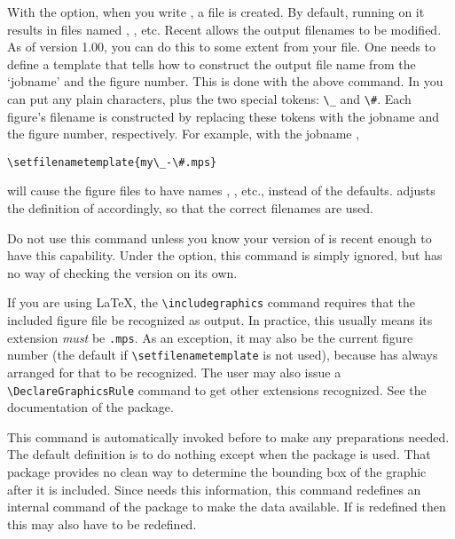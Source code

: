 \documentclass[letterpaper]{article}
\begin{document}
With the  option, when you write
, a file  is created. By
default, running \MP{} on it results in files named ,
, etc. Recent \MP{} allows the output filenames to be
modified. As of \mfp{} version 1.00, you can do this to some extent from
your  file. One needs to define a template that tells \MP{}
how to construct the output file name from the `jobname' and the figure
number. This is done with the above command. In  you can
put any plain characters, plus the two special tokens: \verb$\_$ and
\verb$\#$. Each figure's filename is constructed by replacing these
tokens with the \MP{} jobname and the figure number, respectively. For
example, with the jobname ,
\begin{verbatim}
\setfilenametemplate{my\_-\#.mps}
\end{verbatim}
will cause the figure files to have names ,
, etc., instead of the defaults. \Mfp{} adjusts the
definition of  accordingly, so that the correct
filenames are used.

Do not use this command unless you know your version of \MP{} is recent
enough to have this capability. Under the  option, this
command is simply ignored, but \mfp{} has no way of checking the \MP{}
version on its own.

If you are using \LaTeX{}, the \verb$\includegraphics$ command requires
that the included figure file be recognized as \MP{} output. In practice,
this usually means its extension \emph{must} be \texttt{.mps}. As an
exception, it may also be the current figure number (the default if
\verb$\setfilenametemplate$ is not used), because \mfp{} has always
arranged for that to be recognized. The user may also issue a
\verb$\DeclareGraphicsRule$ command to get other extensions recognized.
See the documentation of the  package.


\begin{cd}
%
\end{cd}

This command is automatically invoked before  to
make any preparations needed. The default definition is to do nothing
except when the  package is used. That package provides
no clean way to determine the bounding box of the graphic after it is
included. Since \mfp{} needs this information, this command redefines an
internal command of the  package to make the data
available. If  is redefined then this may also have
to be redefined.
\end{document}
